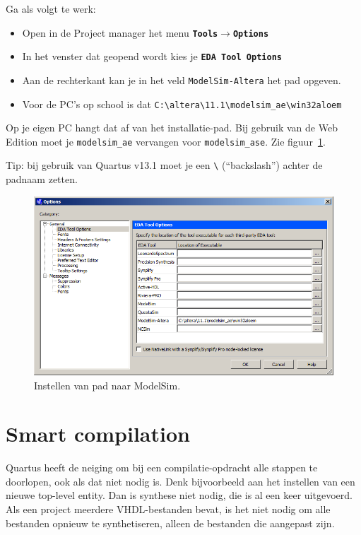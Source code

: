 \documentclass[a4paper,12pt,fleqn,twoside]{book}
\def\tutpicscale{0.455}
\newcommand{\menu}[1]{\texttt{\textbf{#1}}}
\newcommand{\naam}[1]{\texttt{#1}}
\def\pijl{$\rightarrow$}%
\begin{document}
Ga als volgt te werk:

\begin{itemize}\itemsep-1pt
\item Open in de Project manager het menu \menu{Tools\pijl{}Options}
\item In het venster dat geopend wordt kies je \menu{EDA Tool Options}
\item Aan de rechterkant kan je in het veld \naam{ModelSim-Altera} het pad opgeven.
\item Voor de PC's op school is dat \lstinline|C:\altera\11.1\modelsim_ae\win32aloem|
\end{itemize}

Op je eigen PC hangt dat af van het installatie-pad. Bij gebruik van de Web
Edition moet je \naam{modelsim\_ae} vervangen voor \naam{modelsim\_ase}. Zie
figuur~\ref{fig:212modelsimpath2}.

Tip: bij gebruik van Quartus v13.1 moet je een \lstinline|\| (``backslash'')
achter de padnaam zetten.

\begin{figure}[H]
\centering
\includegraphics[scale=\tutpicscale]{212modelsimpath2.png}
\caption{Instellen van pad naar ModelSim.}
\label{fig:212modelsimpath2}
\end{figure}


\section{Smart compilation}
\label{sec:smartcompilation}
Quartus heeft de neiging om bij een compilatie-opdracht alle stappen te
doorlopen, ook als dat niet nodig is. Denk bijvoorbeeld aan het instellen van
een nieuwe top-level entity. Dan is synthese niet nodig, die is al een keer
uitgevoerd. Als een project meerdere VHDL-bestanden bevat, is het niet nodig
om alle bestanden opnieuw te synthetiseren, alleen de bestanden die aangepast
zijn.
\end{document}
